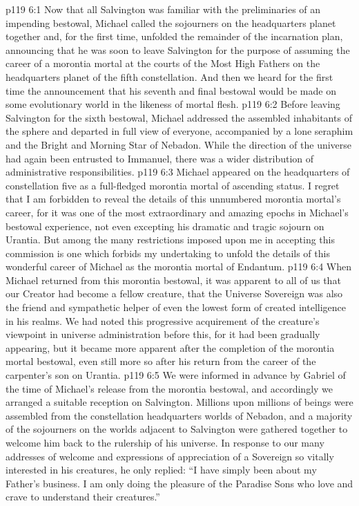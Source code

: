 \vs p119 6:1 Now that all Salvington was familiar with the preliminaries of an impending bestowal, Michael called the sojourners on the headquarters planet together and, for the first time, unfolded the remainder of the incarnation plan, announcing that he was soon to leave Salvington for the purpose of assuming the career of a morontia mortal at the courts of the Most High Fathers on the headquarters planet of the fifth constellation. And then we heard for the first time the announcement that his seventh and final bestowal would be made on some evolutionary world in the likeness of mortal flesh.
\vs p119 6:2 Before leaving Salvington for the sixth bestowal, Michael addressed the assembled inhabitants of the sphere and departed in full view of everyone, accompanied by a lone seraphim and the Bright and Morning Star of Nebadon. While the direction of the universe had again been entrusted to Immanuel, there was a wider distribution of administrative responsibilities.
\vs p119 6:3 Michael appeared on the headquarters of constellation five as a full\hyp{}fledged morontia mortal of ascending status. I regret that I am forbidden to reveal the details of this unnumbered morontia mortal’s career, for it was one of the most extraordinary and amazing epochs in Michael’s bestowal experience, not even excepting his dramatic and tragic sojourn on Urantia. But among the many restrictions imposed upon me in accepting this commission is one which forbids my undertaking to unfold the details of this wonderful career of Michael as the morontia mortal of Endantum.
\vs p119 6:4 When Michael returned from this morontia bestowal, it was apparent to all of us that our Creator had become a fellow creature, that the Universe Sovereign was also the friend and sympathetic helper of even the lowest form of created intelligence in his realms. We had noted this progressive acquirement of the creature’s viewpoint in universe administration before this, for it had been gradually appearing, but it became more apparent after the completion of the morontia mortal bestowal, even still more so after his return from the career of the carpenter’s son on Urantia.
\vs p119 6:5 We were informed in advance by Gabriel of the time of Michael’s release from the morontia bestowal, and accordingly we arranged a suitable reception on Salvington. Millions upon millions of beings were assembled from the constellation headquarters worlds of Nebadon, and a majority of the sojourners on the worlds adjacent to Salvington were gathered together to welcome him back to the rulership of his universe. In response to our many addresses of welcome and expressions of appreciation of a Sovereign so vitally interested in his creatures, he only replied: “I have simply been about my Father’s business. I am only doing the pleasure of the Paradise Sons who love and crave to understand their creatures.”
